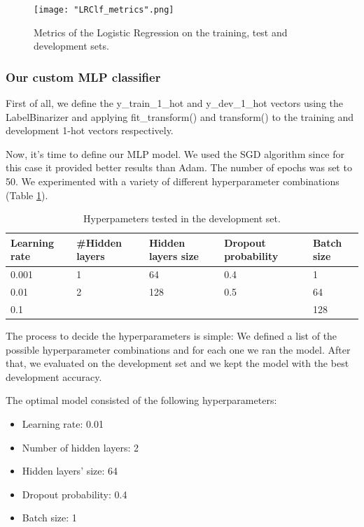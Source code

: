 \documentclass[10pt, a4paper]{article}
\begin{document}
    \begin{figure}
	    \centering
            \texttt{[image: "LRClf\_metrics".png]}
	    \caption{Metrics of the Logistic Regression on the training, test and development sets.}
	    \label{fig::LR_metrics}
     \end{figure}


    \subsubsection{Our custom MLP classifier}

    First of all, we define the y\_train\_1\_hot and y\_dev\_1\_hot vectors using the LabelBinarizer and applying fit\_transform() and transform() to the training and development 1-hot vectors respectively.
    
    Now, it’s time to define our MLP model. We used the SGD algorithm since for this case it provided better results than Adam. The number of epochs was set to 50. We experimented with a variety of different hyperparameter combinations (Table \ref{tab::ex-9-hyper}).

  


\begin{table}
    \centering
    \begin{tabular}{|l|l|l|l|l|}
    \hline
    \rowcolor{blue!25}\textbf{Learning rate} & \cellcolor{blue!25}\textbf{\#Hidden layers} & \cellcolor{blue!25}\textbf{Hidden layers size} & \cellcolor{blue!25}\textbf{Dropout probability} & \cellcolor{blue!25}\textbf{Batch size}\\
    \hline
    0.001 & 1 & 64 & 0.4 & 1\\
    \hline
    0.01 & 2 & 128 & 0.5 & 64\\
    \hline
    0.1 &  &  & & 128 \\
   
    

    \hline
    \end{tabular}
    \caption{Hyperpameters tested in the development set.}
    \label{tab::ex-9-hyper}
\end{table}

The process to decide the hyperparameters is simple: We defined a list of the possible hyperparameter combinations and for each one we ran the model. After that, we evaluated on the development set and we kept the model with the best development accuracy.


    The optimal model consisted of the following hyperparameters:
    \begin{itemize}
        \item Learning rate: 0.01
        \item Number of hidden layers: 2
        \item Hidden layers' size: 64
        \item Dropout probability: 0.4
        \item Batch size: 1
    \end{itemize}
    
\end{document}
